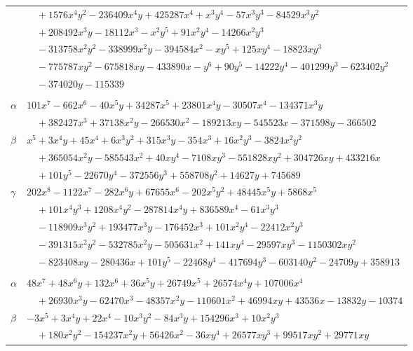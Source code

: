 \documentclass[11pt]{article}
\begin{document}
\begin{longtable}{@{}ll@{}}
 & $\quad +1576x^{4}y^{2}-236409x^{4}y+425287x^{4}+x^{3}y^{4}-57x^{3}y^{3}-84529x^{3}y^{2}$\\
 & $\quad +208492x^{3}y-18112x^{3}-x^{2}y^{5}+91x^{2}y^{4}-14266x^{2}y^{3}$\\
 & $\quad -313758x^{2}y^{2}-338999x^{2}y-394584x^{2}-xy^{5}+125xy^{4}-18823xy^{3}$\\
 & $\quad -775787xy^{2}-675818xy-433890x-y^{6}+90y^{5}-14222y^{4}-401299y^{3}-623402y^{2}$\\
 & $\quad -374020y-115339$\\
\addlinespace[3pt]
\multicolumn{2}{@{}l}{$\{i,j\}=\{80,133\}$, $k_{ij}=2^{3}\cdot 7^{2}\cdot 13$}\\
$\alpha$ & $101x^{7}-662x^{6}-40x^{5}y+34287x^{5}+23801x^{4}y-30507x^{4}-134371x^{3}y$\\
 & $\quad +382427x^{3}+37138x^{2}y-266530x^{2}-189213xy-545523x-371598y-366502$\\
$\beta$ & $x^{5}+3x^{4}y+45x^{4}+6x^{3}y^{2}+315x^{3}y-354x^{3}+16x^{2}y^{3}-3824x^{2}y^{2}$\\
 & $\quad +365054x^{2}y-585543x^{2}+40xy^{4}-7108xy^{3}-551828xy^{2}+304726xy+433216x$\\
 & $\quad +101y^{5}-22670y^{4}-372556y^{3}+558708y^{2}+14627y+745689$\\
$\gamma$ & $202x^{8}-1122x^{7}-282x^{6}y+67655x^{6}-202x^{5}y^{2}+48445x^{5}y+5868x^{5}$\\
 & $\quad +101x^{4}y^{3}+1208x^{4}y^{2}-287814x^{4}y+836589x^{4}-61x^{3}y^{3}$\\
 & $\quad -118909x^{3}y^{2}+193477x^{3}y-176452x^{3}+101x^{2}y^{4}-22412x^{2}y^{3}$\\
 & $\quad -391315x^{2}y^{2}-532785x^{2}y-505631x^{2}+141xy^{4}-29597xy^{3}-1150302xy^{2}$\\
 & $\quad -823408xy-280436x+101y^{5}-22468y^{4}-417694y^{3}-603140y^{2}-24709y+358913$\\
\addlinespace[3pt]
\multicolumn{2}{@{}l}{$\{i,j\}=\{80,143\}$, $k_{ij}=2\cdot 7\cdot 13\cdot 19$}\\
$\alpha$ & $48x^{7}+48x^{6}y+132x^{6}+36x^{5}y+26749x^{5}+26574x^{4}y+107006x^{4}$\\
 & $\quad +26930x^{3}y-62470x^{3}-48357x^{2}y-110601x^{2}+46994xy+43536x-13832y-10374$\\
$\beta$ & $-3x^{5}+3x^{4}y+22x^{4}-10x^{3}y^{2}-84x^{3}y+154296x^{3}+10x^{2}y^{3}$\\
 & $\quad +180x^{2}y^{2}-154237x^{2}y+56426x^{2}-36xy^{4}+26577xy^{3}+99517xy^{2}+29771xy$\\

\end{longtable}
\end{document}
